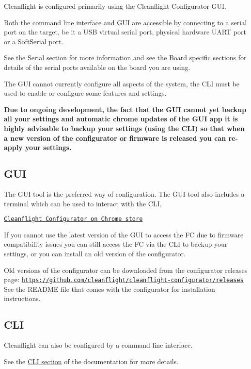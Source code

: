 Cleanflight is configured primarily using the Cleanflight Configurator G\+U\+I.

Both the command line interface and G\+U\+I are accessible by connecting to a serial port on the target, be it a U\+S\+B virtual serial port, physical hardware U\+A\+R\+T port or a Soft\+Serial port.

See the Serial section for more information and see the Board specific sections for details of the serial ports available on the board you are using.

The G\+U\+I cannot currently configure all aspects of the system, the C\+L\+I must be used to enable or configure some features and settings.

{\bfseries Due to ongoing development, the fact that the G\+U\+I cannot yet backup all your settings and automatic chrome updates of the G\+U\+I app it is highly advisable to backup your settings (using the C\+L\+I) so that when a new version of the configurator or firmware is released you can re-\/apply your settings.}

\subsection*{G\+U\+I}



The G\+U\+I tool is the preferred way of configuration. The G\+U\+I tool also includes a terminal which can be used to interact with the C\+L\+I.

\href{https://chrome.google.com/webstore/detail/cleanflight-configurator/enacoimjcgeinfnnnpajinjgmkahmfgb}{\tt Cleanflight Configurator on Chrome store}

If you cannot use the latest version of the G\+U\+I to access the F\+C due to firmware compatibility issues you can still access the F\+C via the C\+L\+I to backup your settings, or you can install an old version of the configurator.

Old versions of the configurator can be downloaded from the configurator releases page\+: \href{https://github.com/cleanflight/cleanflight-configurator/releases}{\tt https\+://github.\+com/cleanflight/cleanflight-\/configurator/releases} See the R\+E\+A\+D\+M\+E file that comes with the configurator for installation instructions.

\subsection*{C\+L\+I}

Cleanflight can also be configured by a command line interface.

See the \hyperlink{Cli_8md}{C\+L\+I section} of the documentation for more details. 